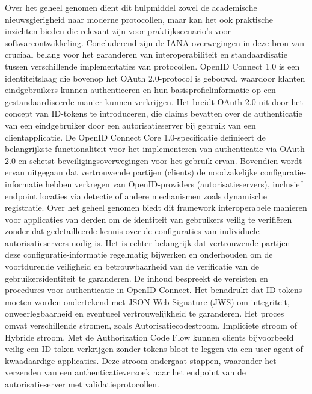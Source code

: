 \newline
Over het geheel genomen dient dit hulpmiddel zowel de academische nieuwsgierigheid naar moderne protocollen, maar kan het ook praktische inzichten bieden die relevant zijn voor praktijkscenario's voor softwareontwikkeling.
Concluderend zijn de IANA-overwegingen in deze bron van cruciaal belang voor het garanderen van interoperabiliteit en standaardisatie tussen verschillende implementaties van protocollen.
\newline
OpenID Connect 1.0 is een identiteitslaag die bovenop het OAuth 2.0-protocol is gebouwd, waardoor klanten eindgebruikers kunnen authenticeren en hun basisprofielinformatie op een gestandaardiseerde manier kunnen verkrijgen. Het breidt OAuth 2.0 uit door het concept van ID-tokens te introduceren, die claims bevatten over de authenticatie van een eindgebruiker door een autorisatieserver bij gebruik van een clientapplicatie.
\newline
De OpenID Connect Core 1.0-specificatie definieert de belangrijkste functionaliteit voor het implementeren van authenticatie via OAuth 2.0 en schetst beveiligingsoverwegingen voor het gebruik ervan.
\newline
Bovendien wordt ervan uitgegaan dat vertrouwende partijen (clients) de noodzakelijke configuratie-informatie hebben verkregen van OpenID-providers (autorisatieservers), inclusief endpoint locaties via detectie of andere mechanismen zoals dynamische registratie.
\newline
Over het geheel genomen biedt dit framework interoperabele manieren voor applicaties van derden om de identiteit van gebruikers veilig te verifiëren zonder dat gedetailleerde kennis over de configuraties van individuele autorisatieservers nodig is.
Het is echter belangrijk dat vertrouwende partijen deze configuratie-informatie regelmatig bijwerken en onderhouden om de voortdurende veiligheid en betrouwbaarheid van de verificatie van de gebruikersidentiteit te garanderen.
\newline
De inhoud bespreekt de vereisten en procedures voor authenticatie in OpenID Connect. Het benadrukt dat ID-tokens moeten worden ondertekend met JSON Web Signature (JWS) om integriteit, onweerlegbaarheid en eventueel vertrouwelijkheid te garanderen. Het proces omvat verschillende stromen, zoals Autorisatiecodestroom, Impliciete stroom of Hybride stroom.
\newline
Met de Authorization Code Flow kunnen clients bijvoorbeeld veilig een ID-token verkrijgen zonder tokens bloot te leggen via een user-agent of kwaadaardige applicaties. Deze stroom ondergaat stappen, waaronder het verzenden van een authenticatieverzoek naar het endpoint van de autorisatieserver met validatieprotocollen.
